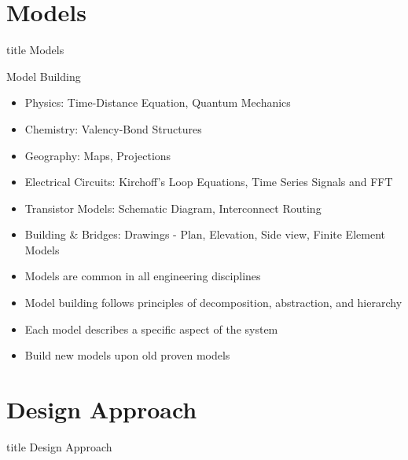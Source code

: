 \documentclass[aspectratio=169, xcolor=dvipsnames]{beamer}
\begin{document}
\section{Models}
\begin{frame}
  \vfill
  \centering
  \begin{beamercolorbox}[sep=8pt,center,shadow=true,rounded=true]{title}
    Models\par%
  \end{beamercolorbox}
  \vfill
\end{frame}

\begin{frame}{Model Building}
    \begin{itemize}[<+->]
        \item Physics: Time-Distance Equation, Quantum Mechanics
        \item Chemistry: Valency-Bond Structures
        \item Geography: Maps, Projections
        \item Electrical Circuits: Kirchoff's Loop Equations, Time Series Signals and FFT
        \item Transistor Models: Schematic Diagram, Interconnect Routing
        \item Building \& Bridges: Drawings - Plan, Elevation, Side view, Finite Element Models
        \item Models are common in all engineering disciplines
        \item Model building follows principles of decomposition, abstraction, and hierarchy
        \item Each model describes a specific aspect of the system
        \item Build new models upon old proven models
    \end{itemize}
\end{frame}

\section{Design Approach}
\begin{frame}
  \vfill
  \centering
  \begin{beamercolorbox}[sep=8pt,center,shadow=true,rounded=true]{title}
    Design Approach\par%
  \end{beamercolorbox}
  \vfill
\end{frame}
\end{document}
